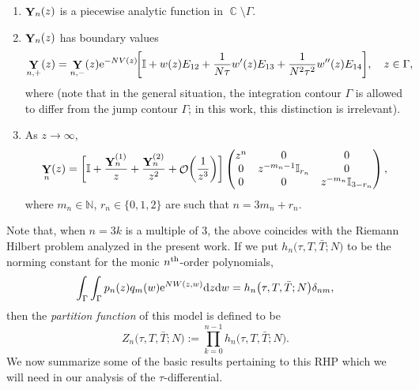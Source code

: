 \documentclass[10pt,a4paper]{amsart}
\DeclareMathOperator{\CC}{\mathbb{C}}
\DeclareMathOperator{\OO}{\mathcal{O}}
\DeclareMathOperator{\YY}{{\bf Y}}
\numberwithin{equation}{section}
\begin{document}
 \begin{enumerate}\itemsep=0pt
 \item[$(1)$] $\YY_{n}(z)$ is a piecewise analytic function in $\CC\setminus \Gamma$.
 \item[$(2)$] $\YY_n(z)$ has boundary values
 \begin{gather*}
 \YY_{n,+}(z) = \YY_{n,-}(z) {\rm e}^{-NV(z)}\!\biggl[ \mathbb{I} + w(z)E_{12} + \frac{1}{N\tau} w'(z)E_{13} + \frac{1}{N^2\tau^2} w''(z)E_{14} \biggr],\quad z\in \Gamma,
 \end{gather*}
 where  (note that in the general situation, the integration contour $\Gamma$ is allowed to differ from the jump contour $\Gamma$; in this work, this distinction is irrelevant).
 \item[$(3)$] As $z\to \infty$,
 \begin{gather*}
 \YY_n(z) = \biggl[\mathbb{I} + \frac{\YY_{n}^{(1)}}{z} + \frac{\YY_{n}^{(2)}}{z^2} + \OO\biggl(\frac{1}{z^3}\biggr)\biggr]
 \begin{pmatrix}
 z^n & 0 & 0\\
 0 & z^{-m_n - 1}\mathbb{I}_{r_n} & 0\\
 0 & 0 & z^{-m_n}\mathbb{I}_{3-r_n}\\
 \end{pmatrix},
 \end{gather*}
 where $m_n\in \mathbb{N}$, $r_n \in \{0,1,2\}$ are such that $n = 3 m_n + r_n$.
 \end{enumerate}
Note that, when $n = 3k$ is a multiple of $3$, the above coincides with the Riemann Hilbert problem analyzed in the present work.
If we put $h_n\bigl(\tau,T,\bar{T};N\bigr)$ to be the norming constant for the monic $n^{\rm th}$-order polynomials,
 \begin{equation*}
 \int_{\Gamma}\int_{\Gamma} p_n(z)q_m(w) {\rm e}^{N W(z,w)}{\rm d}z{\rm d}w = h_n\bigl(\tau,T,\bar{T};N\bigr)\delta_{nm},
 \end{equation*}
then the \textit{partition function} of this model is defined to be
 \begin{equation*}
 Z_n\bigl(\tau,T,\bar{T};N\bigr) := \prod_{k=0}^{n-1}h_n\bigl(\tau,T,\bar{T};N\bigr).
 \end{equation*}
We now summarize some of the basic results pertaining to this RHP which we will need in our analysis of the $\tau$-differential.
\end{document}
